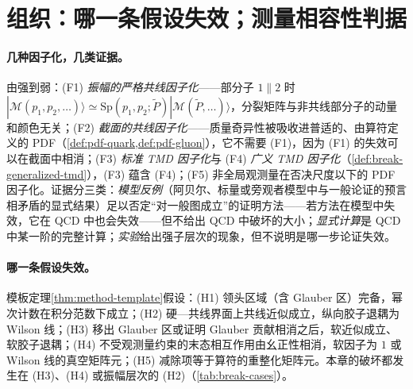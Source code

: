 \section{组织：哪一条假设失效；测量相容性判据}\label{sec:break-overview}

\paragraph{几种因子化，几类证据。}由强到弱：(F1) \emph{振幅的严格共线因子化}——部分子 $1\parallel2$ 时 $|\mathcal M(p_1,p_2,\dots)\rangle\simeq\mathrm{Sp}(p_1,p_2;\tilde P)|\mathcal M(\tilde P,\dots)\rangle$，分裂矩阵与非共线部分子的动量和颜色无关；(F2) \emph{截面的共线因子化}——质量奇异性被吸收进普适的、由算符定义的 PDF（\cref{def:pdf-quark,def:pdf-gluon}），它不需要 (F1)，因为 (F1) 的失效可以在截面中相消；(F3) \emph{标准 TMD 因子化}与 (F4) \emph{广义 TMD 因子化}（\cref{def:break-generalized-tmd}），(F3) 蕴含 (F4)；(F5) 非全局观测量在否决尺度以下的 PDF 因子化。证据分三类：\emph{模型反例}（阿贝尔、标量或旁观者模型中与一般论证的预言相矛盾的显式结果）足以否定“对一般图成立”的证明方法——若方法在模型中失效，它在 QCD 中也会失效\cite{Collins2007}——但不给出 QCD 中破坏的大小；\emph{显式计算}是 QCD 中某一阶的完整计算；\emph{实验}给出强子层次的现象，但不说明是哪一步论证失效。

\paragraph{哪一条假设失效。}模板定理\cref{thm:method-template}假设：(H1) 领头区域（含 Glauber 区）完备，幂次计数在积分范数下成立；(H2) 硬—共线界面上共线近似成立，纵向胶子退耦为 Wilson 线；(H3) 移出 Glauber 区或证明 Glauber 贡献相消之后，软近似成立、软胶子退耦；(H4) 不受观测量约束的末态相互作用由幺正性相消，软因子为 $1$ 或 Wilson 线的真空矩阵元；(H5) 减除项等于算符的重整化矩阵元。本章的破坏都发生在 (H3)、(H4) 或振幅层次的 (H2)（\cref{tab:break-cases}）。

